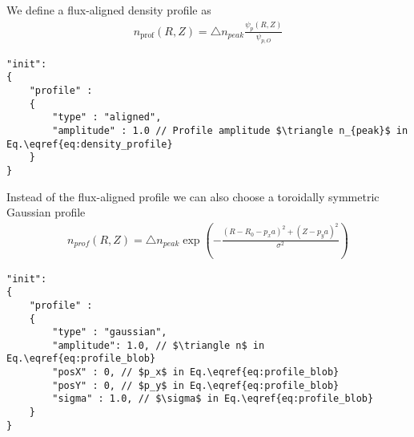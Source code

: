 We define a flux-aligned density profile as
\begin{align} \label{eq:density_profile}
  n_{\text{prof}}(R,Z)= \triangle n_{peak}\frac{\psi_p(R,Z) }{\psi_{p,O}}
\end{align}
\begin{verbatim}
"init":
{
    "profile" :
    {
        "type" : "aligned",
        "amplitude" : 1.0 // Profile amplitude $\triangle n_{peak}$ in Eq.\eqref{eq:density_profile}
    }
}
\end{verbatim}

Instead of the flux-aligned profile we can also choose a toroidally symmetric Gaussian profile
\begin{align} \label{eq:profile_blob}
  n_{prof}(R,Z) = \triangle n_{peak} \exp\left( -\frac{(R - R_0 - p_x a)^2 + (Z-p_ya)^2}{\sigma^2} \right)
\end{align}
\begin{verbatim}
"init":
{
    "profile" :
    {
        "type" : "gaussian",
        "amplitude": 1.0, // $\triangle n$ in Eq.\eqref{eq:profile_blob}
        "posX" : 0, // $p_x$ in Eq.\eqref{eq:profile_blob}
        "posY" : 0, // $p_y$ in Eq.\eqref{eq:profile_blob}
        "sigma" : 1.0, // $\sigma$ in Eq.\eqref{eq:profile_blob}
    }
}
\end{verbatim}
